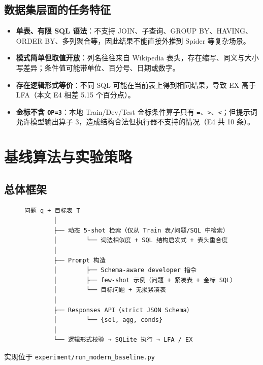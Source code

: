 \documentclass[conference]{IEEEtran}
\begin{document}
\subsection{数据集层面的任务特征}
\begin{itemize}
\item \textbf{单表、有限 SQL 语法}：不支持 JOIN、子查询、GROUP BY、HAVING、ORDER BY、多列聚合等，因此结果不能直接外推到 Spider 等复杂场景。
\item \textbf{模式简单但取值开放}：列名往往来自 Wikipedia 表头，存在缩写、同义与大小写差异；条件值可能带单位、百分号、日期或数字。
\item \textbf{存在逻辑形式等价}：不同 SQL 可能在当前表上得到相同结果，导致 EX 高于 LFA（本文 E4 相差 5.15 个百分点）。
\item \textbf{金标不含 \texttt{OP=3}}：本地 Train/Dev/Test 金标条件算子只有 \texttt{=}、\texttt{\textgreater{}}、\texttt{\textless{}}；但提示词允许模型输出算子 3，造成结构合法但执行器不支持的情况（E4 共 10 条）。
\end{itemize}
\section{基线算法与实验策略}
\subsection{总体框架}
\begin{figure}[t]
\centering
\begin{Verbatim}[fontsize=\scriptsize]
问题 q + 目标表 T
        │
        ├── 动态 5-shot 检索（仅从 Train 表/问题/SQL 中检索）
        │        └── 词法相似度 + SQL 结构启发式 + 表头重合度
        │
        ├── Prompt 构造
        │        ├── Schema-aware developer 指令
        │        ├── few-shot 示例（问题 + 紧凑表 + 金标 SQL）
        │        └── 目标问题 + 无损紧凑表
        │
        ├── Responses API（strict JSON Schema）
        │        └── {sel, agg, conds}
        │
        └── 逻辑形式校验 → SQLite 执行 → LFA / EX
\end{Verbatim}
\end{figure}
实现位于 \texttt{experiment/\allowbreak{}run\_modern\_baseline.py}
\end{document}
